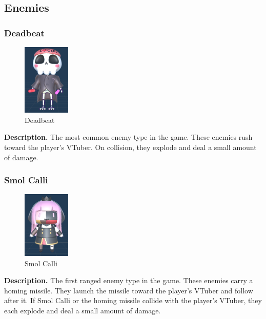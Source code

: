 \documentclass[10pt, a4paper]{article}
\begin{document}
\begin{multicols}{2}
  	\subsection{Enemies} \label{Enemies}

	\subsubsection{Deadbeat}

	\begin{figure}[H]
		\centering
		\includegraphics[width=0.2\textwidth]{images/deadbeat1.png}
		\caption{Deadbeat}
		\label{fig:deadbeat}
	\end{figure}
	
	\textbf{Description.} The most common enemy type in the game. These enemies rush toward the player's VTuber. On collision, they explode and deal a small amount of damage.

	\goodbreak

	\subsubsection{Smol Calli}

	\begin{figure}[H]
		\centering
		\includegraphics[width=0.2\textwidth]{images/smol_calli1.png}
		\caption{Smol Calli}
		\label{fig:smolcalli}
	\end{figure}

	\textbf{Description.} The first ranged enemy type in the game. These enemies carry a homing missile. They launch the missile toward the player's VTuber and follow after it. If Smol Calli or the homing missile collide with the player's VTuber, they each explode and deal a small amount of damage.


\end{multicols}
\end{document}
